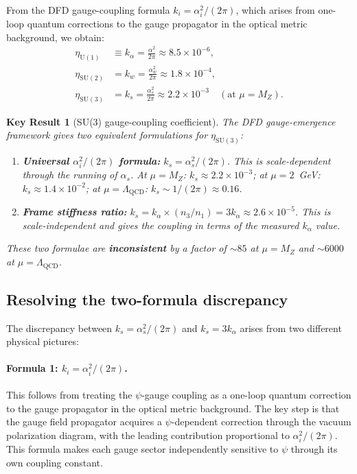 \documentclass[aps,prd,twocolumn,superscriptaddress,floatfix,nofootinbib]{revtex4-2}
\newcommand{\LQCD}{\Lambda_{\mathrm{QCD}}}
\newcommand{\as}{\alpha_s}
\newcommand{\ka}{k_\alpha}
\newcommand{\ks}{k_s}
\newcommand{\alphafine}{\alpha}
\newtheorem{result}{Key Result}
\begin{document}
From the DFD gauge-coupling formula $k_i = \alpha_i^2/(2\pi)$, which arises
from one-loop quantum corrections to the gauge propagator in the optical
metric background, we obtain:
\begin{align}
\eta_{\mathrm{U}(1)} &\equiv \ka = \frac{\alphafine^2}{2\pi}
  \approx 8.5 \times 10^{-6} , \label{eq:eta_U1} \\
\eta_{\mathrm{SU}(2)} &= k_w = \frac{\alpha_w^2}{2\pi}
  \approx 1.8 \times 10^{-4} , \label{eq:eta_SU2} \\
\eta_{\mathrm{SU}(3)} &= \ks = \frac{\as^2}{2\pi}
  \approx 2.2 \times 10^{-3} \quad (\text{at } \mu = M_Z). \label{eq:eta_SU3}
\end{align}

\begin{result}[SU(3) gauge-coupling coefficient]
The DFD gauge-emergence framework gives two equivalent formulations for
$\eta_{\mathrm{SU}(3)}$:
\begin{enumerate}
\item \textbf{Universal $\alpha_i^2/(2\pi)$ formula:}
$\ks = \as^2/(2\pi)$. This is scale-dependent through the running of $\as$.
At $\mu = M_Z$: $\ks \approx 2.2 \times 10^{-3}$; at $\mu = 2$~GeV:
$\ks \approx 1.4 \times 10^{-2}$; at $\mu = \LQCD$: $\ks \sim 1/(2\pi)
\approx 0.16$.

\item \textbf{Frame stiffness ratio:}
$\ks = \ka \times (n_3/n_1) = 3\ka \approx 2.6 \times 10^{-5}$.
This is scale-independent and gives the coupling in terms of the measured
$\ka$ value.
\end{enumerate}
These two formulae are \textbf{inconsistent} by a factor of $\sim 85$
at $\mu = M_Z$ and $\sim 6000$ at $\mu = \LQCD$.
\end{result}

\subsection{Resolving the two-formula discrepancy}\label{sec:discrepancy}

The discrepancy between $\ks = \as^2/(2\pi)$ and $\ks = 3\ka$ arises from
two different physical pictures:

\paragraph{Formula 1: $k_i = \alpha_i^2/(2\pi)$.}
This follows from treating the $\psi$-gauge coupling as a one-loop quantum
correction to the gauge propagator in the optical metric background. The
key step is that the gauge field propagator acquires a $\psi$-dependent
correction through the vacuum polarization diagram, with the leading
contribution proportional to $\alpha_i^2/(2\pi)$. This formula makes each
gauge sector independently sensitive to $\psi$ through its own coupling
constant.
\end{document}
